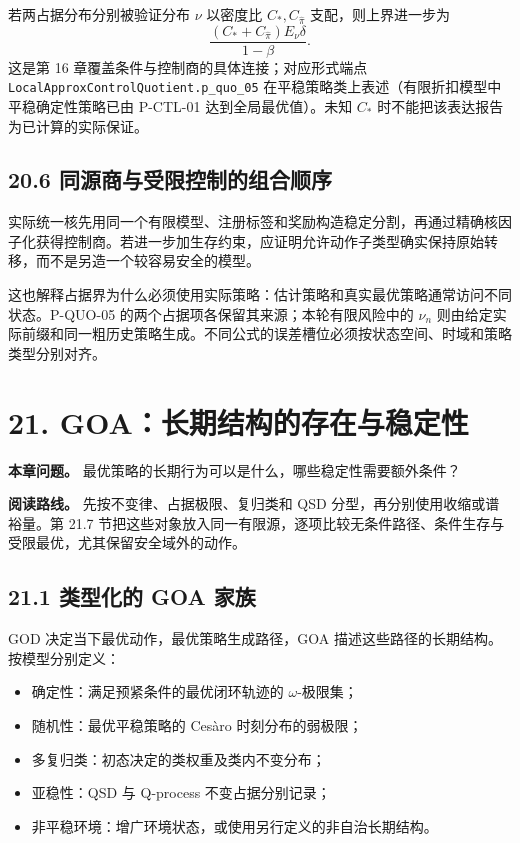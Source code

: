 \documentclass[
  11pt,
  oneside]{book}
\providecommand{\tightlist}{%
  \setlength{\itemsep}{0pt}\setlength{\parskip}{0pt}}
\begin{document}
若两占据分布分别被验证分布 \(\nu\) 以密度比 \(C_*,C_{\widehat\pi}\) 支配，则上界进一步为 \[\frac{(C_*+C_{\widehat\pi})E_\nu\delta}{1-\beta}.\] 这是第 16 章覆盖条件与控制商的具体连接；对应形式端点 \nolinkurl{LocalApproxControlQuotient.p_quo_05} 在平稳策略类上表述（有限折扣模型中平稳确定性策略已由 P-CTL-01 达到全局最优值）。未知 \(C_*\) 时不能把该表达报告为已计算的实际保证。

\section{20.6 同源商与受限控制的组合顺序}\label{ux540cux6e90ux5546ux4e0eux53d7ux9650ux63a7ux5236ux7684ux7ec4ux5408ux987aux5e8f}

实际统一核先用同一个有限模型、注册标签和奖励构造稳定分割，再通过精确核因子化获得控制商。若进一步加生存约束，应证明允许动作子类型确实保持原始转移，而不是另造一个较容易安全的模型。

这也解释占据界为什么必须使用实际策略：估计策略和真实最优策略通常访问不同状态。P-QUO-05 的两个占据项各保留其来源；本轮有限风险中的 \(\nu_n\) 则由给定实际前缀和同一粗历史策略生成。不同公式的误差槽位必须按状态空间、时域和策略类型分别对齐。

\chapter{21. GOA：长期结构的存在与稳定性}\label{ch-21}

\textbf{本章问题。} 最优策略的长期行为可以是什么，哪些稳定性需要额外条件？

\textbf{阅读路线。} 先按不变律、占据极限、复归类和 QSD 分型，再分别使用收缩或谱裕量。第 21.7 节把这些对象放入同一有限源，逐项比较无条件路径、条件生存与受限最优，尤其保留安全域外的动作。

\section{21.1 类型化的 GOA 家族}\label{ux7c7bux578bux5316ux7684-goa-ux5bb6ux65cf}

GOD 决定当下最优动作，最优策略生成路径，GOA 描述这些路径的长期结构。按模型分别定义：

\begin{itemize}
\tightlist
\item
  确定性：满足预紧条件的最优闭环轨迹的 \(\omega\)-极限集；
\item
  随机性：最优平稳策略的 Cesàro 时刻分布的弱极限；
\item
  多复归类：初态决定的类权重及类内不变分布；
\item
  亚稳性：QSD 与 Q-process 不变占据分别记录；
\item
  非平稳环境：增广环境状态，或使用另行定义的非自治长期结构。
\end{itemize}
\end{document}
